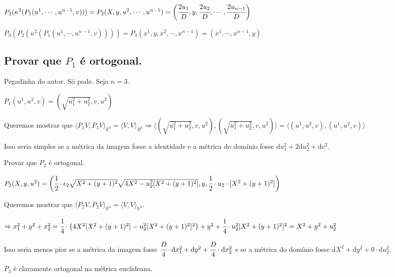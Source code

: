 \documentclass[10pt,a4paper]{article}
\begin{document}
		$P_2(\kappa^2(P_1(u^1, \cdots, u^{n-1}, v))) = P_2(X, y, u^2, \cdots, u^{n-1}) = \bigg( \cfrac{2 u_1}{D}, y, \cfrac{2 u_2}{D}, \cdots, \cfrac{2 u_{n - 1}}{D} \bigg)$

		$P_3(P_2(\kappa^2(P_1(u^1, \cdots, u^{n-1}, v)))) = P_3(x^1, y, x^2, \cdots, x^{n-1}) = (x^1, \cdots, x^{n-1}, y)$

		\subsection{Provar que $P_1$ \'e ortogonal.}
		\begin{flushright}
		\end{flushright}

		Pegadinha do autor. S\'o pode. Seja	$n = 3$.

		$P_1(u^1, u^2, v) = (\sqrt{u_1^2 + u_2^2}, v, u^2)$

		Queremos mostrar que $\langle P_1 V, P_1 V \rangle_{\mathbb{R}^3} = \langle V, V \rangle_{B^3} \Rightarrow \langle (\sqrt{u_1^2 + u_2^2}, v, u^2), (\sqrt{u_1^2 + u_2^2}, v, u^2) \rangle = \langle (u^1, u^2, v), (u^1, u^2, v) \rangle$

		Isso seria simples se a m\'etrica da imagem fosse a identidade e a m\'etrica do dom\'inio fosse d$u_1^2 + 2 \mathrm{d}u_2^2 + \mathrm{d}v^2$.

		\vspace{3mm}

		Provar que $P_2$ \'e ortogonal.

		$P_2(X, y, u^2) = \bigg(\cfrac{1}{2} \cdot \epsilon_2 \sqrt{X^2 + (y + 1)^2} \sqrt{4X^2 - u_2^2 [X^2 + (y + 1)^2]}, y, \cfrac{1}{2} \cdot u_2 \cdot [X^2 + (y+1)^2] \bigg)$

		Queremos mostrar que $\langle P_2 V, P_2 V \rangle_{\mathbb{R}^3} = \langle V, V \rangle_{\mathbb{R}^3}$.

		$\Rightarrow x_1^2  + y^2 + x_2^2 = \cfrac{1}{4} \cdot \{ 4X^2 [X^2 + (y+1)^2] - u_2^2 [X^2 + (y+1)^2]^2 \} + y^2 + \cfrac{1}{4} \cdot u_2^2 [X^2 + (y+1)^2]^2 = X^2 + y^2 + u_2^2$

		Isso seria menos pior se a m\'etrica da imagem fosse $\cfrac{D}{4} \cdot \mathrm{d}x_1^2 + \mathrm{d}y^2 + \cfrac{D}{4} \cdot \mathrm{d}x_2^2$ e se a m\'etrica do dom\'inio fosse d$X^2 + \mathrm{d}y^2 + 0 \cdot \mathrm{d}u_2^2$.

		\vspace{3mm}

		$P_3$ \'e claramente ortogonal na m\'etrica euclideana.
\end{document}
